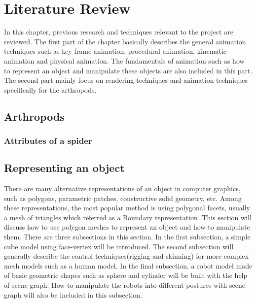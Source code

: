 \chapter{Literature Review}
In this chapter, previous research and techniques relevant to the
project are reviewed. The first part of the chapter basically describes
the general animation techniques such as key frame animation,
procedural animation, kinematic animation and physical animation. The
fundamentals of animation such as how to represent an object and
manipulate these objects are also included in this part. The second
part mainly focus on rendering techniques and animation techniques
specifically for the arthropods.
\section{Arthropods}

\subsection{Attributes of a spider}

\section{Representing an object} 
There are many alternative representations of an object in computer graphics, such as polygons, parametric patches, constructive solid geometry, etc. Among these representations, the most popular method is using polygonal facets, usually a mesh of triangles which referred as a Boundary representation \cite{alan3D}.This section will discuss how to use polygon meshes to represent an object and how to manipulate them. There are three subsections in this section. In the first subsection, a simple cube model using face-vertex will be introduced. The second subsection will generally describe the control techniques(rigging and skinning) for more complex mesh models such as a human model. In the final subsection, a robot model made of basic geometric shapes such as sphere and cylinder will be built with the help of scene graph. How to manipulate the robots into different postures with scene graph will also be included in this subsection. 
